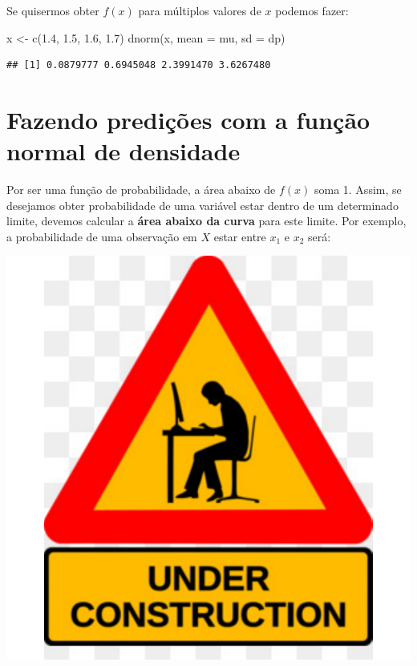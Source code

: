 \documentclass[
]{book}
\newenvironment{Shaded}{\begin{snugshade}}{\end{snugshade}}
\newcommand{\AttributeTok}[1]{\textcolor[rgb]{0.77,0.63,0.00}{#1}}
\newcommand{\FloatTok}[1]{\textcolor[rgb]{0.00,0.00,0.81}{#1}}
\newcommand{\FunctionTok}[1]{\textcolor[rgb]{0.00,0.00,0.00}{#1}}
\newcommand{\NormalTok}[1]{#1}
\newcommand{\OtherTok}[1]{\textcolor[rgb]{0.56,0.35,0.01}{#1}}
\begin{document}
Se quisermos obter \(f(x)\) para múltiplos valores de \(x\) podemos fazer:

\begin{Shaded}
\begin{Highlighting}[]
\NormalTok{x }\OtherTok{\textless{}{-}} \FunctionTok{c}\NormalTok{(}\FloatTok{1.4}\NormalTok{, }\FloatTok{1.5}\NormalTok{, }\FloatTok{1.6}\NormalTok{, }\FloatTok{1.7}\NormalTok{)}
\FunctionTok{dnorm}\NormalTok{(x, }\AttributeTok{mean =}\NormalTok{ mu, }\AttributeTok{sd =}\NormalTok{ dp)}
\end{Highlighting}
\end{Shaded}

\begin{verbatim}
## [1] 0.0879777 0.6945048 2.3991470 3.6267480
\end{verbatim}

\hypertarget{fazendo-prediuxe7uxf5es-com-a-funuxe7uxe3o-normal-de-densidade}{%
\section{Fazendo predições com a função normal de densidade}\label{fazendo-prediuxe7uxf5es-com-a-funuxe7uxe3o-normal-de-densidade}}

Por ser uma função de probabilidade, a área abaixo de \(f(x)\) soma 1. Assim, se desejamos obter probabilidade de uma variável estar dentro de um determinado limite, devemos calcular a \textbf{área abaixo da curva} para este limite. Por exemplo, a probabilidade de uma observação em \(X\) estar entre \(x_1\) e \(x_2\) será:

\begin{center}\includegraphics{probest-cambientais_files/figure-latex/unnamed-chunk-71-1} \end{center}
\end{document}
